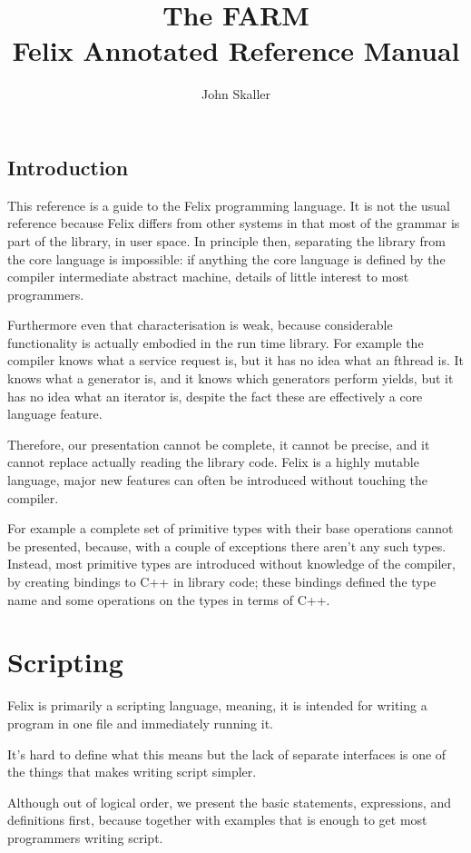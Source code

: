 \documentclass[oneside]{book}
\title{The FARM\\ Felix Annotated Reference Manual}
\author{John Skaller}
\begin{document}
\maketitle
\tableofcontents
\chapter{Introduction}
This reference is a guide to the Felix programming language.
It is not the usual reference because Felix differs from
other systems in that most of the grammar is part of the library,
in user space. In principle then, separating the library from the 
core language is impossible: if anything the core language is
defined by the compiler intermediate abstract machine, details
of little interest to most programmers.

Furthermore even that characterisation is weak, because considerable
functionality is actually embodied in the run time library. For example
the compiler knows what a service request is, but it has no idea
what an fthread is. It knows what a generator is, and it knows which
generators perform yields, but it has no idea what an iterator is,
despite the fact these are effectively a core language feature.

Therefore, our presentation cannot be complete, it cannot be precise,
and it cannot replace actually reading the library code. Felix is a highly
mutable language, major new features can often be introduced without
touching the compiler.

For example a complete set of primitive types with their base
operations cannot be presented, because, with a couple of exceptions
there aren't any such types. Instead, most primitive types are introduced
without knowledge of the compiler, by creating bindings to C++ in 
library code; these bindings defined the type name and some operations
on the types in terms of C++.

\part{Scripting}
Felix is primarily a scripting language, meaning, it is intended
for writing a program in one file and immediately running it.

It's hard to define what this means but the lack of separate 
interfaces  is one of the things that makes writing script simpler.

Although out of logical order, we present the basic statements,
expressions, and definitions first, because together with examples
that is enough to get most programmers writing script.
\end{document}
